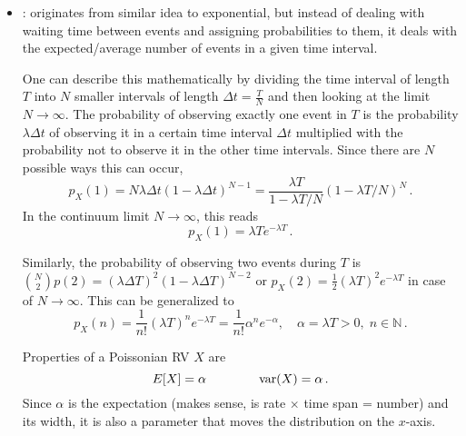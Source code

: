 \begin{ex}
\begin{itemize}


\item {}: originates from similar idea to exponential, but instead of dealing with waiting time between events and assigning probabilities to them, it deals with the expected/average number of events in a given time interval.

One can describe this mathematically by dividing the time interval of length $T$ into $N$ smaller intervals of length $\Delta t = \frac{T}{N}$ and then looking at the limit $N \rightarrow \infty$. The probability of observing exactly one event in $T$ is the probability $\lambda \Delta t$ of observing it in a certain time interval $\Delta t$ multiplied with the probability not to observe it in the other time intervals. Since there are $N$ possible ways this can occur,
\begin{equation*}
p_X(1) = N \lambda \Delta t (1 - \lambda \Delta t)^{N - 1} = \frac{\lambda T}{1 - \lambda T/ N} (1 - \lambda T/ N)^N \, .
\end{equation*}
In the continuum limit $N \rightarrow \infty$, this reads
\begin{equation*}
p_X(1) = \lambda T e^{- \lambda T} \, .
\end{equation*}

Similarly, the probability of observing two events during $T$ is $\binom{N}{2} p(2) = (\lambda \Delta T)^2 (1 - \lambda \Delta T)^{N - 2}$ or $p_X(2) = \frac{1}{2} (\lambda T)^2 e^{- \lambda T}$ in case of $N \rightarrow \infty$. This can be generalized to
\begin{equation}
p_X(n) = \frac{1}{n!} (\lambda T)^n e^{- \lambda T} = \frac{1}{n!} \alpha^n e^{- \alpha}, \quad \alpha = \lambda T > 0, \; n \in \mathbb{N} \, .
\end{equation}



Properties of a Poissonian RV $X$ are
\begin{equation}
E[X] = \alpha \qquad \qquad \operatorname{var}(X) = \alpha \, .
\end{equation}
Since $\alpha$ is the expectation (makes sense, is rate $\times$ time span = number) and its width, it is also a parameter that moves the distribution on the $x$-axis.%



\end{itemize}
\end{ex}
